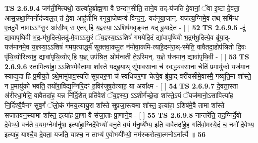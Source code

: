 \documentclass[17pt]{extarticle}
\begin{document}
                  \newline
                                \textbf{ TS 2.6.9.4} \newline
                  जग॑ती॒मित्यथो॒ खल्वा॑हुर्ब्राह्म॒णा वै छन्दाꣳ॒॒सीति॒ ताने॒व तद्-य॑जति दे॒वानां॒ ॅवा इ॒ष्टा दे॒वता॒ आस॒न्नथा॒ग्निर्नोद॑ज्वल॒त् तं दे॒वा आहु॑तीभि-रनूया॒जेष्वन्व॑-विन्द॒न्॒. यद॑नूया॒जान्. यज॑त्य॒ग्निमे॒व तथ् समि॑न्ध ए॒तदु॒र्वै नामा॑ऽऽ*सु॒र आ॑सी॒थ् स ए॒तर्.हि॑ य॒ज्ञ्स्या॒ ऽऽशिष॑मवृङ्क्त॒ यद् ब्रू॒यादे॒त - [  ] \textbf{  52} \newline
                  \newline
                                \textbf{ TS 2.6.9.5} \newline
                  -दु॑ द्यावापृथिवी भ॒द्र-म॑भू॒दित्ये॒तदु॑-मे॒वाऽऽसु॒रं ॅय॒ज्ञ्स्या॒ऽऽशिषं॑ गमयेदि॒दं द्या॑वापृथिवी भ॒द्रम॑भू॒दित्ये॒व ब्रू॑या॒द्-यज॑मानमे॒व य॒ज्ञ्स्या॒ऽऽशिषं॑ गमय॒त्यार्द्ध्म॑ सूक्तवा॒कमु॒त न॑मोवा॒कमि-त्या॑हे॒दम॑रा॒थ्-स्मेति॒ वावैतदा॒होप॑श्रितो दि॒वः पृ॑थि॒व्योरित्या॑ह॒ द्यावा॑पृथि॒व्योर्.हि य॒ज्ञ् उप॑श्रित॒ ओम॑न्वती ते॒ऽस्मिन्. य॒ज्ञे य॑जमान॒ द्यावा॑पृथि॒वी - [  ] \textbf{  53} \newline
                  \newline
                                \textbf{ TS 2.6.9.6} \newline
                  स्ता॒मित्या॑हा॒ ऽऽशिष॑मे॒वैतामा शा᳚स्ते॒ यद्ब्रू॒याथ् सू॑पावसा॒ना च॑ स्वद्ध्यवसा॒ना चेति॑ प्र॒मायु॑को॒ यज॑मानः स्याद्य॒दा हि प्र॒मीय॒ते ऽथे॒मामु॑पाव॒स्यति॑ सूपचर॒णा च॑ स्वधिचर॒णा चेत्ये॒व ब्रू॑या॒द्-वरी॑यसीमे॒वास्मै॒ गव्यू॑ति॒मा शा᳚स्ते॒ न प्र॒मायु॑को भवति॒ तयो॑रा॒विद्य॒ग्निरि॒दꣳ ह॒विर॑जुष॒तेत्या॑ह॒ या अया᳚क्ष्म - [  ] \textbf{  54} \newline
                  \newline
                                \textbf{ TS 2.6.9.7} \newline
                  दे॒वता॒स्ता अ॑रीरधा॒मेति॒ वावैतदा॑ह॒ यन्न नि॑र्दि॒शेत् प्रति॑वेशं ॅय॒ज्ञ्स्या॒ ऽऽशीर्ग॑च्छे॒दा शा᳚स्ते॒ऽयं ॅयज॑मानो॒ऽसावित्या॑ह नि॒र्दिश्यै॒वैनꣳ॑ सुव॒र्गं ॅलो॒कं ग॑मय॒त्यायु॒रा शा᳚स्ते सुप्रजा॒स्त्वमा शा᳚स्त॒ इत्या॑हा॒ ऽशिष॑मे॒वै तामा शा᳚स्ते सजातवन॒स्यामा शा᳚स्त॒ इत्या॑ह प्रा॒णा वै स॑जा॒ताः प्रा॒णाने॒व - [  ] \textbf{  55} \newline
                  \newline
                                \textbf{ TS 2.6.9.8} \newline
                  नान्तरे॑ति॒ तद॒ग्निर्दे॒वो दे॒वेभ्यो॒ वन॑ते व॒यम॒ग्नेर्मानु॑षा॒ इत्या॑हा॒ग्निर्दे॒वेभ्यो॑ वनु॒ते व॒यं म॑नु॒ष्ये᳚भ्य॒ इति॒ वावैतदा॑हे॒ह गति॑र्वा॒मस्ये॒दं च॒ नमो॑ दे॒वेभ्य॒ इत्या॑ह॒ याश्चै॒व दे॒वता॒ यज॑ति॒ याश्च॒ न ताभ्य॑ ए॒वोभयी᳚भ्यो॒ नम॑स्करोत्या॒त्मनोऽना᳚र्त्यै ॥ \textbf{  56} \newline
\end{document}
